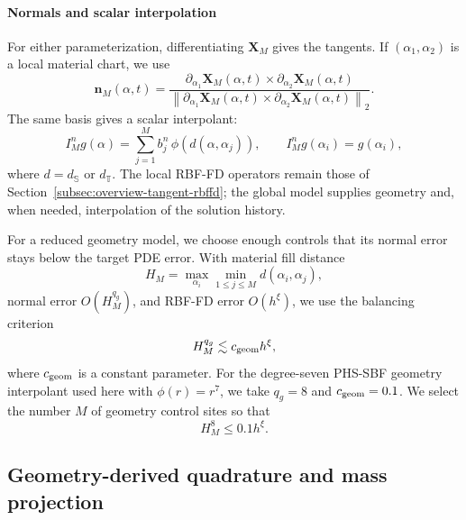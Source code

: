 \documentclass[a4paper,fleqn]{cas-sc}
\begin{document}
\paragraph{Normals and scalar interpolation}
For either parameterization, differentiating $\bm X_M$ gives the tangents.  If
$(\alpha_1,\alpha_2)$ is a local material chart, we use
\begin{equation}
  \bm n_M(\alpha,t)
  =
  \frac{
    \partial_{\alpha_1}\bm X_M(\alpha,t)
    \times
    \partial_{\alpha_2}\bm X_M(\alpha,t)
  }{
    \left\|
      \partial_{\alpha_1}\bm X_M(\alpha,t)
      \times
      \partial_{\alpha_2}\bm X_M(\alpha,t)
    \right\|_2
  }.
  \label{eq:sbf-normal-model}
\end{equation}
The same basis gives a scalar interpolant:
\begin{equation}
  I_M^n g(\alpha)
  =
  \sum_{j=1}^M b_j^n\,
  \phi\!\left(d(\alpha,\alpha_j)\right),
  \qquad
  I_M^n g(\alpha_i)=g(\alpha_i),
  \label{eq:global-sbf-scalar-interpolant}
\end{equation}
where $d=d_{\mathbb S}$ or $d_{\mathbb T}$.  The local RBF-FD operators remain
those of Section~\ref{subsec:overview-tangent-rbffd}; the global model supplies
geometry and, when needed, interpolation of the solution history.

For a reduced geometry model, we choose enough controls that its normal error
stays below the target PDE error.  With material fill distance
\[
H_M=\max_{\alpha_i}\min_{1\leq j\leq M}d(\alpha_i,\alpha_j),
\]
normal error $O(H_M^{q_g})$, and RBF-FD error $O(h^\xi)$, we use the balancing
criterion
\begin{equation}
  H_M^{q_g}\lesssim c_{\rm geom} h^\xi,
  \label{eq:sbf-control-balance}
\end{equation}
where $c_{\rm geom}$ is a constant parameter. For the degree-seven PHS-SBF geometry interpolant used here with $\phi(r) = r^7$, we take $q_g =8$  and $c_{\rm geom} = 0.1$. We select the number \(M\) of geometry control
sites so that
\[
H_M^8 \le 0.1h^\xi.
\]
\subsection{Geometry-derived quadrature and mass projection}
\label{subsec:mass-conservation-projection}
\end{document}
